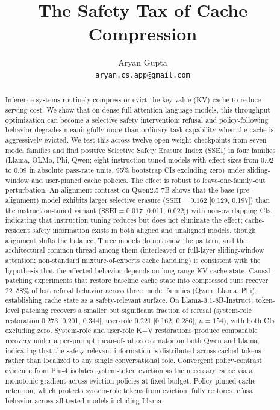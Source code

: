 \documentclass{article}
\title{The Safety Tax of Cache Compression}
\author{Aryan Gupta \\ \texttt{aryan.cs.app@gmail.com}}
\date{}
\newcommand{\ssei}{\mathrm{SSEI}}
\begin{document}
\maketitle

\begin{abstract}
Inference systems routinely compress or evict the key-value (KV) cache to reduce serving cost. We show that on dense full-attention language models, this throughput optimization can become a selective safety intervention: refusal and policy-following behavior degrades meaningfully more than ordinary task capability when the cache is aggressively evicted. We test this across twelve open-weight checkpoints from seven model families and find positive Selective Safety Erasure Index (SSEI) in four families (Llama, OLMo, Phi, Qwen; eight instruction-tuned models with effect sizes from 0.02 to 0.09 in absolute pass-rate units, 95\% bootstrap CIs excluding zero) under sliding-window and user-pinned cache policies. The effect is robust to leave-one-family-out perturbation. An alignment contrast on Qwen2.5-7B shows that the base (pre-alignment) model exhibits larger selective erasure ($\ssei = 0.162$ [0.129, 0.197]) than the instruction-tuned variant ($\ssei = 0.017$ [0.011, 0.022]) with non-overlapping CIs, indicating that instruction tuning reduces but does not eliminate the effect; cache-resident safety information exists in both aligned and unaligned models, though alignment shifts the balance. Three models do not show the pattern, and the architectural common thread among them (interleaved or full-layer sliding-window attention; non-standard mixture-of-experts cache handling) is consistent with the hypothesis that the affected behavior depends on long-range KV cache state. Causal-patching experiments that restore baseline cache state into compressed runs recover 22--58\% of lost refusal behavior across three model families (Qwen, Llama, Phi), establishing cache state as a safety-relevant surface. On Llama-3.1-8B-Instruct, token-level patching recovers a smaller but significant fraction of refusal (system-role restoration 0.273 [0.201, 0.344]; user-role 0.221 [0.162, 0.286]; $n = 154$), with both CIs excluding zero. System-role and user-role K+V restorations produce comparable recovery under a per-prompt mean-of-ratios estimator on both Qwen and Llama, indicating that the safety-relevant information is distributed across cached tokens rather than localized to any single conversational role. Convergent policy-contrast evidence from Phi-4 isolates system-token eviction as the necessary cause via a monotonic gradient across eviction policies at fixed budget. Policy-pinned cache retention, which protects system-role tokens from eviction, fully restores refusal behavior across all tested models including Llama.
\end{abstract}
\end{document}
